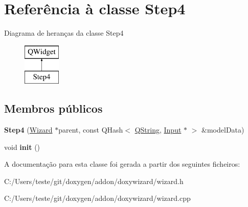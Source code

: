\hypertarget{class_step4}{\section{Referência à classe Step4}
\label{class_step4}
}
Diagrama de heranças da classe Step4\begin{figure}[H]
\begin{center}
\leavevmode
\includegraphics[height=2.000000cm]{class_step4}
\end{center}
\end{figure}
\subsection*{Membros públicos}
\begin{DoxyCompactItemize}
\item 
\hypertarget{class_step4_a11462984b63dd2b2f55ff776aea94937}{{\bfseries Step4} (\hyperlink{class_wizard}{Wizard} $\ast$parent, const Q\-Hash$<$ \hyperlink{class_q_string}{Q\-String}, \hyperlink{class_input}{Input} $\ast$ $>$ \&model\-Data)}\label{class_step4_a11462984b63dd2b2f55ff776aea94937}

\item 
\hypertarget{class_step4_a02fd73d861ef2e4aabb38c0c9ff82947}{void {\bfseries init} ()}\label{class_step4_a02fd73d861ef2e4aabb38c0c9ff82947}

\end{DoxyCompactItemize}


A documentação para esta classe foi gerada a partir dos seguintes ficheiros\-:\begin{DoxyCompactItemize}
\item 
C\-:/\-Users/teste/git/doxygen/addon/doxywizard/wizard.\-h\item 
C\-:/\-Users/teste/git/doxygen/addon/doxywizard/wizard.\-cpp\end{DoxyCompactItemize}
